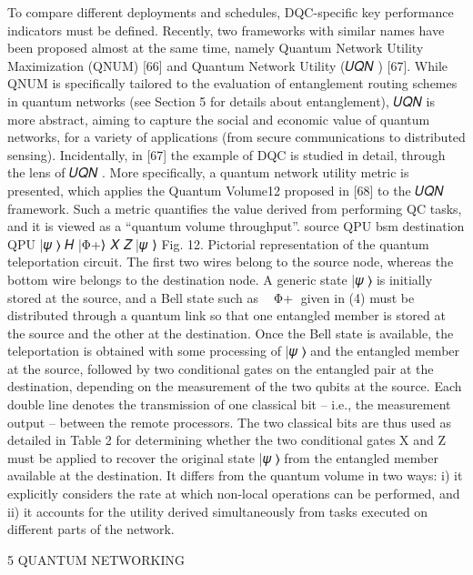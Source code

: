To compare different deployments and schedules, DQC-specific key performance indicators must be defined. Recently, two frameworks with similar names have been proposed almost at the same time, namely Quantum Network Utility Maximization (QNUM) [66] and Quantum Network Utility (𝑈𝑄𝑁 ) [67]. While QNUM is specifically tailored to the evaluation of entanglement routing schemes in quantum networks (see Section 5 for details about entanglement), 𝑈𝑄𝑁 is more abstract, aiming to capture the social and economic value of quantum networks, for a variety of applications (from secure communications to distributed sensing). Incidentally, in [67] the example of DQC is studied in detail, through the lens of 𝑈𝑄𝑁 . More specifically, a quantum network utility metric is presented, which applies the Quantum Volume12 proposed in [68] to the 𝑈𝑄𝑁 framework. Such a metric quantifies the value derived from performing QC tasks, and it is viewed as a “quantum volume throughput”. source QPU bsm destination QPU |𝜓 ⟩ 𝐻 |Φ+⟩ 𝑋 𝑍 |𝜓 ⟩ Fig. 12. Pictorial representation of the quantum teleportation circuit. The first two wires belong to the source node, whereas the bottom wire belongs to the destination node. A generic state |𝜓 ⟩ is initially stored at the source, and a Bell state such as  Φ+ given in (4) must be distributed through a quantum link so that one entangled member is stored at the source and the other at the destination. Once the Bell state is available, the teleportation is obtained with some processing of |𝜓 ⟩ and the entangled member at the source, followed by two conditional gates on the entangled pair at the destination, depending on the measurement of the two qubits at the source. Each double line denotes the transmission of one classical bit – i.e., the measurement output – between the remote processors. The two classical bits are thus used as detailed in Table 2 for determining whether the two conditional gates X and Z must be applied to recover the original state |𝜓 ⟩ from the entangled member available at the destination. It differs from the quantum volume in two ways: i) it explicitly considers the rate at which non-local operations can be performed, and ii) it accounts for the utility derived simultaneously from tasks executed on different parts of the network.

5 QUANTUM NETWORKING 

